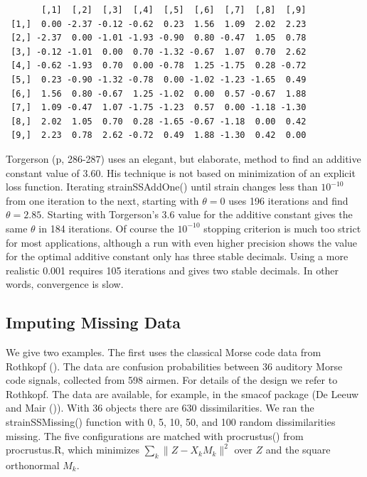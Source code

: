 \documentclass[
  12pt,
  letterpaper,
  DIV=11,
  numbers=noendperiod]{scrartcl}
\begin{document}
\begin{verbatim}
       [,1]  [,2]  [,3]  [,4]  [,5]  [,6]  [,7]  [,8]  [,9]
 [1,]  0.00 -2.37 -0.12 -0.62  0.23  1.56  1.09  2.02  2.23
 [2,] -2.37  0.00 -1.01 -1.93 -0.90  0.80 -0.47  1.05  0.78
 [3,] -0.12 -1.01  0.00  0.70 -1.32 -0.67  1.07  0.70  2.62
 [4,] -0.62 -1.93  0.70  0.00 -0.78  1.25 -1.75  0.28 -0.72
 [5,]  0.23 -0.90 -1.32 -0.78  0.00 -1.02 -1.23 -1.65  0.49
 [6,]  1.56  0.80 -0.67  1.25 -1.02  0.00  0.57 -0.67  1.88
 [7,]  1.09 -0.47  1.07 -1.75 -1.23  0.57  0.00 -1.18 -1.30
 [8,]  2.02  1.05  0.70  0.28 -1.65 -0.67 -1.18  0.00  0.42
 [9,]  2.23  0.78  2.62 -0.72  0.49  1.88 -1.30  0.42  0.00
\end{verbatim}

Torgerson (p, 286-287) uses an elegant, but elaborate, method to find an
additive constant value of 3.60. His technique is not based on
minimization of an explicit loss function. Iterating strainSSAddOne()
until strain changes less than \ensuremath{10^{-10}} from one iteration
to the next, starting with \(\theta=0\) uses 196 iterations and find
\(\theta=2.85\). Starting with Torgerson's 3.6 value for the additive
constant gives the same \(\theta\) in 184 iterations. Of course the
\ensuremath{10^{-10}} stopping criterion is much too strict for most
applications, although a run with even higher precision shows the value
for the optimal additive constant only has three stable decimals. Using
a more realistic 0.001 requires 105 iterations and gives two stable
decimals. In other words, convergence is slow.

\subsection{Imputing Missing Data}\label{imputing-missing-data-1}

We give two examples. The first uses the classical Morse code data from
Rothkopf (). The data are confusion
probabilities between 36 auditory Morse code signals, collected from 598
airmen. For details of the design we refer to Rothkopf. The data are
available, for example, in the smacof package (De Leeuw and Mair
()). With 36 objects there are
630 dissimilarities. We ran the strainSSMissing() function with 0, 5,
10, 50, and 100 random dissimilarities missing. The five configurations
are matched with procrustus() from procrustus.R, which minimizes
\(\sum_k\|Z-X_kM_k\|^2\) over \(Z\) and the square orthonormal \(M_k\).
\end{document}
